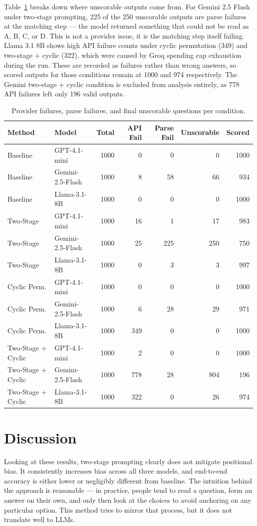 \documentclass{article}
\begin{document}
Table~\ref{tab:failures} breaks down where unscorable outputs come from. For Gemini 2.5 Flash under two-stage prompting, 225 of the 250 unscorable outputs are parse failures at the matching step --- the model returned something that could not be read as A, B, C, or D. This is not a provider issue, it is the matching step itself failing. Llama 3.1 8B shows high API failure counts under cyclic permutation (349) and two-stage + cyclic (322), which were caused by Groq spending cap exhaustion during the run. These are recorded as failures rather than wrong answers, so scored outputs for those conditions remain at 1000 and 974 respectively. The Gemini two-stage + cyclic condition is excluded from analysis entirely, as 778 API failures left only 196 valid outputs.


\begin{table}[ht]
\centering
\caption{Provider failures, parse failures, and final unscorable questions per condition.}
\label{tab:failures}
\begin{tabular}{llrrrrr}
\toprule
Method & Model & Total & API Fail & Parse Fail & Unscorable & Scored \\
\midrule
Baseline & GPT-4.1-mini & 1000 & 0 & 0 & 0 & 1000 \\
Baseline & Gemini-2.5-Flash & 1000 & 8 & 58 & 66 & 934 \\
Baseline & Llama-3.1-8B & 1000 & 0 & 0 & 0 & 1000 \\
Two-Stage & GPT-4.1-mini & 1000 & 16 & 1 & 17 & 983 \\
Two-Stage & Gemini-2.5-Flash & 1000 & 25 & 225 & 250 & 750 \\
Two-Stage & Llama-3.1-8B & 1000 & 0 & 3 & 3 & 997 \\
Cyclic Perm. & GPT-4.1-mini & 1000 & 0 & 0 & 0 & 1000 \\
Cyclic Perm. & Gemini-2.5-Flash & 1000 & 6 & 28 & 29 & 971 \\
Cyclic Perm. & Llama-3.1-8B & 1000 & 349 & 0 & 0 & 1000 \\
Two-Stage + Cyclic & GPT-4.1-mini & 1000 & 2 & 0 & 0 & 1000 \\
Two-Stage + Cyclic & Gemini-2.5-Flash & 1000 & 778 & 28 & 804 & 196 \\
Two-Stage + Cyclic & Llama-3.1-8B & 1000 & 322 & 0 & 26 & 974 \\
\bottomrule
\end{tabular}
\end{table}
 
\section{Discussion}
Looking at these results, two-stage prompting clearly does not mitigate positional bias. It consistently increases bias across all three models, and end-to-end accuracy is either lower or negligibly different from baseline. The intuition behind the approach is reasonable --- in practice, people tend to read a question, form an answer on their own, and only then look at the choices to avoid anchoring on any particular option. This method tries to mirror that process, but it does not translate well to LLMs.
\end{document}
